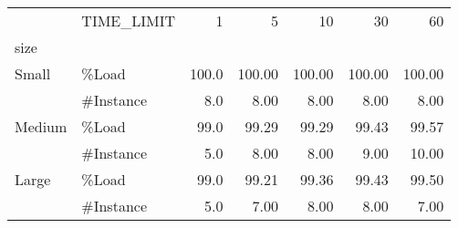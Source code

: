\begin{tabular}{llrrrrr}
\toprule
      & TIME\_LIMIT &     1  &      5  &      10 &      30 &      60 \\
size & {} &        &         &         &         &         \\
\midrule
Small & \%Load &  100.0 &  100.00 &  100.00 &  100.00 &  100.00 \\
      & \#Instance &    8.0 &    8.00 &    8.00 &    8.00 &    8.00 \\
Medium & \%Load &   99.0 &   99.29 &   99.29 &   99.43 &   99.57 \\
      & \#Instance &    5.0 &    8.00 &    8.00 &    9.00 &   10.00 \\
Large & \%Load &   99.0 &   99.21 &   99.36 &   99.43 &   99.50 \\
      & \#Instance &    5.0 &    7.00 &    8.00 &    8.00 &    7.00 \\
\bottomrule
\end{tabular}
